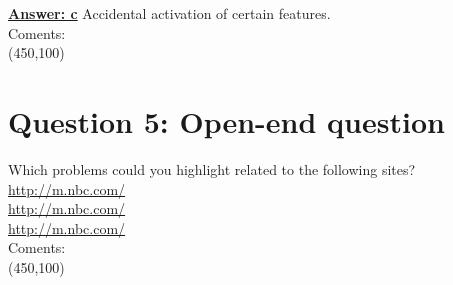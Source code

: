 \documentclass[12pt,a4paper,norsk]{article}
\begin{document}
\underline{\textbf{Answer: c}} Accidental activation of certain features. \\

\noindent Coments:\\
\framebox(450,100){}\\

\section {Question 5: Open-end question} Which problems could you highlight related to the following sites?\\
\href{http://m.nbc.com/}{http://m.nbc.com/}\\
\href{http://m.ikea.com/}{http://m.nbc.com/}\\
\href{http://m.bestbuy.com/}{http://m.nbc.com/}\\


\noindent Coments:\\
\framebox(450,100){}\\
\end{document}
